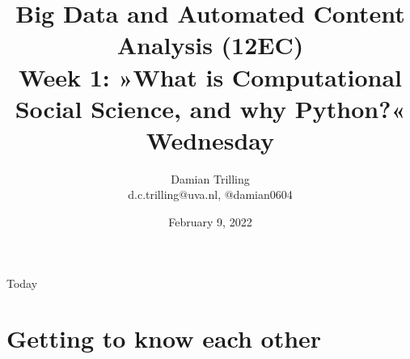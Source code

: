 

\graphicspath{{../../resources/img/}}




\title[Big Data and Automated Content Analysis]{\textbf{Big Data and Automated Content Analysis (12EC)} 
\\Week 1: »What is Computational Social Science, and why Python?«
\\Wednesday }
\author[Damian Trilling]{Damian Trilling\\ \footnotesize{d.c.trilling@uva.nl, @damian0604 \\}}
\date{February 9, 2022}


\begin{frame}{}
	\titlepage
\end{frame}

\begin{frame}{Today}
	\tableofcontents
\end{frame}




\section{Getting to know each other}

